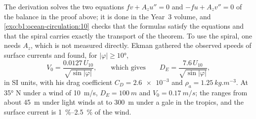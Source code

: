 The derivation solves the two equations $f v + A_z u'' = 0$ and $-f u + A_z v'' =
0$ of the balance in the proof above; it is done in the Year~3 volume, and
\cref{exo:b1:ocean-circulation:10} checks that the formulas satisfy the equations
and that the spiral carries exactly the transport of the theorem. To use the
spiral, one needs $A_z$, which is not measured directly. Ekman gathered the
observed speeds of surface currents and found, for $|\varphi| \geq \ang{10}$,
\[
  V_0 = \frac{0.0127\,U_{10}}{\sqrt{\sin|\varphi|}},
  \qquad\text{which gives}\qquad
  D_E = \frac{7.6\,U_{10}}{\sqrt{\sin|\varphi|}},
\]
in SI units, with his drag coefficient $C_D = \num{2.6e-3}$ and $\rho_a =
\qty{1.25}{kg.m^{-3}}$. At \ang{35} N under a wind of \qty{10}{m/s}, $D_E =
\qty{100}{m}$ and $V_0 = \qty{0.17}{m/s}$; the  ranges from about
\qty{45}{m} under light winds at  to \qty{300}{m} under a gale in the
tropics, and the surface current is \qtyrange{1}{2.5}{\percent} of the wind.

